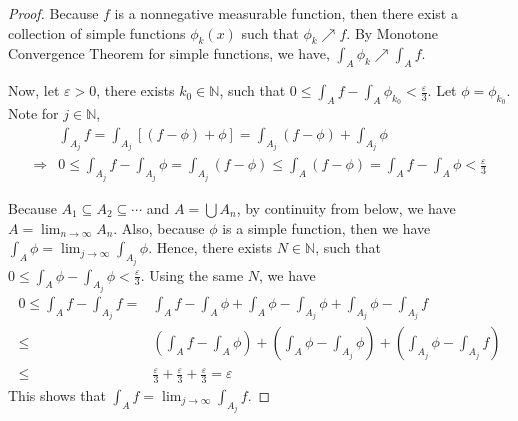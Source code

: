 \begin{answer}
    \begin{proof}
        Because $f$ is a nonnegative measurable function, then there exist a collection of simple functions $\phi_k(x)$ such that $\phi_{k} \nearrow f$. By Monotone Convergence Theorem for simple functions, we have, $\int_A \phi_k \nearrow \int_A f$.
        
        Now, let $\varepsilon > 0$, there exists $k_0 \in \mathbb{N}$, such that $0 \leq \int_A f - \int_A \phi_{k_0} < \tfrac{\varepsilon}{3}$. Let $\phi = \phi_{k_0}$. Note for $j \in \mathbb{N}$, 
        \begin{equation}
            \begin{aligned}
                &\int_{A_j} f = \int_{A_j} [(f-\phi) + \phi] = \int_{A_j} (f-\phi) + \int_{A_j} \phi\\
                \Rightarrow& 0 \leq \int_{A_j} f - \int_{A_j} \phi = \int_{A_j} (f-\phi) \leq \int_A (f - \phi) = \int_A f - \int_A \phi < \tfrac{\varepsilon}{3}
            \end{aligned}
         \end{equation}
        
        Because $A_1 \subseteq A_2 \subseteq \cdots$ and $A = \bigcup A_n$, by continuity from below, we have $A = \lim_{n \to \infty} A_n$. Also, because $\phi$ is a simple function, then we have $\int_A \phi = \lim_{j \to \infty} \int_{A_j} \phi$. Hence, there exists $N \in \mathbb{N}$, such that $0 \leq \int_A \phi - \int_{A_j} \phi < \tfrac{\varepsilon}{3}$. Using the same $N$, we have
        \begin{equation}
            \begin{aligned}
                0 \leq \int_A f - \int_{A_j} f =& \int_A f - \int_A \phi + \int_A \phi - \int_{A_j} \phi + \int_{A_j} \phi - \int_{A_j} f\\
                \leq& \left(\int_A f - \int_A \phi \right) + \left(\int_A \phi - \int_{A_j} \phi \right) + \left(\int_{A_j} \phi - \int_{A_j} f \right)\\
                \leq& \tfrac{\varepsilon}{3} + \tfrac{\varepsilon}{3} + \tfrac{\varepsilon}{3} = \varepsilon
            \end{aligned}
        \end{equation}
        This shows that $\int_A f = \lim_{j \to \infty} \int_{A_j} f$.
    \end{proof}
\end{answer}